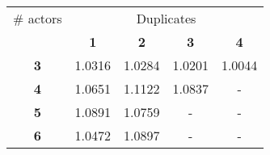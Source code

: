 \begin{tabular}{ | c | c | c | c | c | }
\hline
\# actors & \multicolumn{4}{|c|}{Duplicates} \\ \cline{2-5}
 & {\bf1} & {\bf2} & {\bf3} & {\bf4} \\ \hline
{\bf 3} & 1.0316 & 1.0284 & 1.0201 & 1.0044 \\ \hline
{\bf 4} & 1.0651 & 1.1122 & 1.0837 & - \\ \hline
{\bf 5} & 1.0891 & 1.0759 & - & - \\ \hline
{\bf 6} & 1.0472 & 1.0897 & - & - \\ \hline
\end{tabular}
